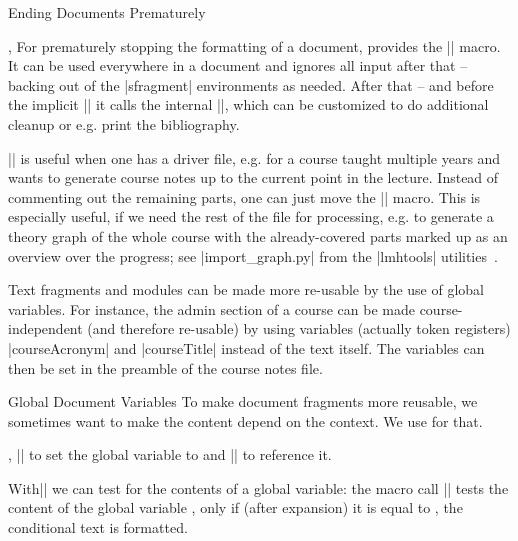 \begin{sfragment}{Ending Documents Prematurely}
  \begin{function}{\prematurestop,\afterprematurestop}
    For prematurely stopping the formatting of a document, \sTeX provides the
    |\prematurestop| macro. It can be used everywhere in a document and ignores all input
    after that -- backing out of the |sfragment| environments as needed. After that -- and
    before the implicit || it calls the internal |\afterprematurestop|, which
    can be customized to do additional cleanup or e.g. print the bibliography.
  
    |\prematurestop| is useful when one has a driver file, e.g. for a course taught multiple
    years and wants to generate course notes up to the current point in the lecture. Instead
    of commenting out the remaining parts, one can just move the |\prematurestop| macro.
    This is especially useful, if we need the rest of the file for processing, e.g. to
    generate a theory graph of the whole course with the already-covered parts marked up as
    an overview over the progress; see |import_graph.py| from the |lmhtools|
    utilities~\cite{lmhtools:github:on}.
  \end{function}
  
  Text fragments and modules can be made more re-usable by the use of global variables. For
  instance, the admin section of a course can be made course-independent (and therefore
  re-usable) by using variables (actually token registers) |courseAcronym| and |courseTitle|
  instead of the text itself. The variables can then be set in the \sTeX preamble of the
  course notes file.
\end{sfragment}


\begin{sfragment}{Global Document Variables}
  To make document fragments more reusable, we sometimes want to make the content depend
  on the context. We use  for that.

\begin{function}{\setSGvar,\useSGvar}
  || to set the global variable  to
   and || to reference it.
\end{function}
  
\begin{function}{\ifSGvar}
  With|\ifSGvar| we can test for the contents of a global variable: the macro call
  || tests the content of the global
  variable , only if (after expansion) it is equal to , the
  conditional text  is formatted.
\end{function}
\end{sfragment}

